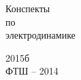 \vspace*{5cm}

\begin{center}
	\LARGE{Конспекты}\\[0.5cm]
	\LARGE{по}\\[0.5cm]
	\LARGE{электродинамике}
\end{center}

\vspace{7.7cm}

\begin{center}
2015б\\[0.5cm]
ФТШ -- 2014
\end{center}